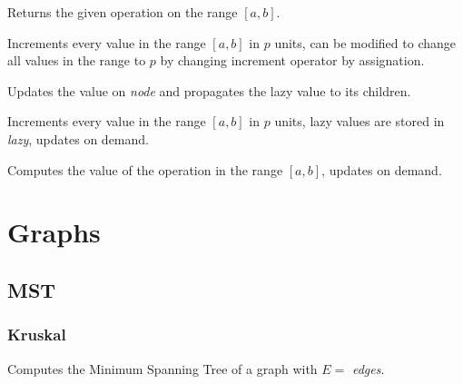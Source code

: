 \documentclass[12pt]{article}
\begin{document}
\noindent\begin{minipage}{\linewidth}

\end{minipage}
Returns the given operation on the range $[a, b]$.

\noindent\begin{minipage}{\linewidth}

\end{minipage}
Increments every value in the range $[a, b]$ in $p$ units,
can be modified to change all values in the range to $p$ by changing
increment operator by assignation.

\noindent\begin{minipage}{\linewidth}

\end{minipage}
Updates the value on \textit{node} and propagates
the lazy value to its children.

\noindent\begin{minipage}{\linewidth}

\end{minipage}
Increments every value in the range $[a, b]$ in $p$ units, lazy values
are stored in \textit{lazy}, updates on demand.

\noindent\begin{minipage}{\linewidth}

\end{minipage}
Computes the value of the operation in the range $[a, b]$, updates on demand.

\section{Graphs}
\subsection{MST}
\subsubsection{Kruskal}
\noindent\begin{minipage}{\linewidth}

\end{minipage}
Computes the Minimum Spanning Tree of a graph with $E =$ \textit{edges}.
\end{document}
